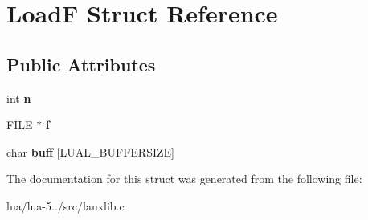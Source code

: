 \hypertarget{struct_load_f}{\section{Load\+F Struct Reference}
\label{struct_load_f}
}
\subsection*{Public Attributes}
\begin{DoxyCompactItemize}
\item 
\hypertarget{struct_load_f_ad9ad8babe60118da09b9844d0237eaff}{int {\bfseries n}}\label{struct_load_f_ad9ad8babe60118da09b9844d0237eaff}

\item 
\hypertarget{struct_load_f_aa799802294df0b9f2778e0fc5c04aaf5}{F\+I\+L\+E $\ast$ {\bfseries f}}\label{struct_load_f_aa799802294df0b9f2778e0fc5c04aaf5}

\item 
\hypertarget{struct_load_f_a9b16f3571b835a967633e15d602470cb}{char {\bfseries buff} \mbox{[}L\+U\+A\+L\+\_\+\+B\+U\+F\+F\+E\+R\+S\+I\+Z\+E\mbox{]}}\label{struct_load_f_a9b16f3571b835a967633e15d602470cb}

\end{DoxyCompactItemize}


The documentation for this struct was generated from the following file\+:\begin{DoxyCompactItemize}
\item 
lua/lua-\/5../src/lauxlib.\+c\end{DoxyCompactItemize}
